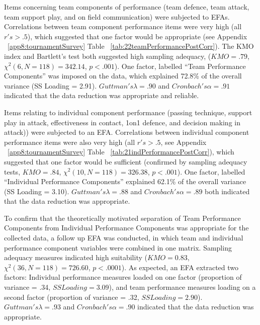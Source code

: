 \begin{CJK}{UTF8}{gbsn}
Items concerning team components of performance (team defence, team attack, team support play, and on field communication) were subjected to EFAs.  Correlations between team component performance items were very high (all $r's > .5$), which suggested that one factor would be appropriate (see Appendix ~\ref{app8:tournamentSurvey} Table ~\ref{tab:22teamPerformancePostCorr}). The KMO index and Bartlett's test both suggested high sampling adequacy, ($KMO = .79$, $\chi^2(6, N = 118) = 342.14$, $p < .001$).  One factor, labelled ``Team Performance Components'' was imposed on the data, which explained 72.8\% of the overall variance (SS Loading = 2.91). $Guttman's \lambda =.90$ and $Cronbach's\alpha = .91$ indicated that the data reduction was appropriate and reliable.

Items relating to individual component performance (passing technique, support play in attack, effectiveness in contact, 1on1 defence, and decision making in attack))  were subjected to an EFA.  Correlations between individual component performance items were also very high (all $r's > .5$, see Appendix ~\ref{app8:tournamentSurvey} Table ~\ref{tab:21indPerformancePostCorr}), which suggested that one factor would be sufficient (confirmed by sampling adequacy tests, $KMO =  .84$, $\chi^2(10, N = 118) =  326.38$, $p < .001$).  One factor, labelled ``Individual Performance Components'' explained 62.1\% of the overall variance (SS Loading = 3.10).
$Guttman's \lambda =.88$ and $Cronbach's  \alpha = .89$ both indicated that the data reduction was appropriate.

To confirm that the theoretically motivated separation of Team Performance Components from Individual Performance Components was appropriate for the collected data, a follow up EFA was conducted, in which team and individual performance component variables were combined in one matrix.  Sampling adequacy measures indicated high suitability ($KMO = 0.83$, $\chi^2(36, N = 118) = 726.60$, $p < .0001$).  As expected, an EFA extracted two factors: Individual performance measures loaded on one factor (proportion of variance = .34, $SS Loading = 3.09$), and team performance measures loading on a second factor (proportion of variance = .32, $SS Loading = 2.90$). $Guttman's \lambda =.93$ and $Cronbach's \alpha = .90$ indicated that the data reduction was appropriate.


\end{CJK}
